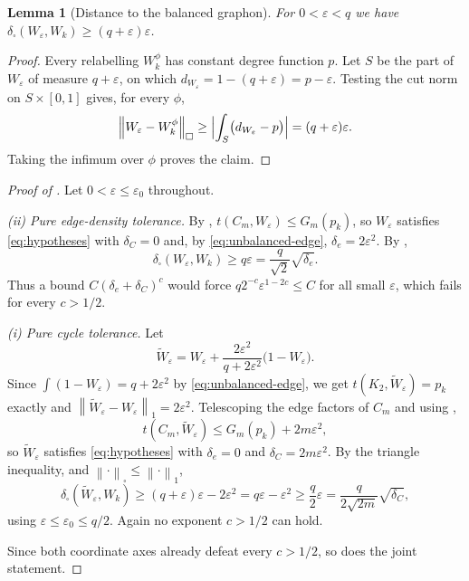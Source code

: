 \documentclass[11pt]{article}
\newtheorem{lemma}[theorem]{Lemma}
\theoremstyle{remark}
\newcommand{\dsq}{\delta_{\square}}
\newcommand{\norm}[1]{\left\lVert #1\right\rVert}
\begin{document}
\begin{lemma}[Distance to the balanced graphon]\label{lem:distance}
For $0<\varepsilon<q$ we have
$\dsq(W_\varepsilon,W_k)\geq(q+\varepsilon)\varepsilon$.
\end{lemma}

\begin{proof}
Every relabelling $W_k^\phi$ has constant degree function $p$. Let $S$ be
the part of $W_\varepsilon$ of measure $q+\varepsilon$, on which
$d_{W_\varepsilon}=1-(q+\varepsilon)=p-\varepsilon$. Testing the cut norm
on $S\times[0,1]$ gives, for every $\phi$,
\[
 \norm{W_\varepsilon-W_k^\phi}_{\square}
 \geq\Bigl\lvert\int_S\bigl(d_{W_\varepsilon}-p\bigr)\Bigr\rvert
 =(q+\varepsilon)\varepsilon .
\]
Taking the infimum over $\phi$ proves the claim.
\end{proof}

\begin{proof}[Proof of ]
Let $0<\varepsilon\leq\varepsilon_0$ throughout.

\emph{(ii) Pure edge-density tolerance.}
By , $t(C_m,W_\varepsilon)\leq G_m(p_k)$, so
$W_\varepsilon$ satisfies \eqref{eq:hypotheses} with
$\delta_C=0$ and, by \eqref{eq:unbalanced-edge},
$\delta_e=2\varepsilon^2$. By ,
\[
 \dsq(W_\varepsilon,W_k)\geq q\varepsilon
 =\frac{q}{\sqrt2}\sqrt{\delta_e}.
\]
Thus a bound $C(\delta_e+\delta_C)^c$ would force
$q2^{-c}\varepsilon^{1-2c}\leq C$ for all small $\varepsilon$, which
fails for every $c>1/2$.

\emph{(i) Pure cycle tolerance.}
Let
\[
 \widetilde W_\varepsilon
 =W_\varepsilon+\frac{2\varepsilon^2}{q+2\varepsilon^2}
 \bigl(1-W_\varepsilon\bigr).
\]
Since $\int(1-W_\varepsilon)=q+2\varepsilon^2$ by
\eqref{eq:unbalanced-edge}, we get
$t(K_2,\widetilde W_\varepsilon)=p_k$ exactly and
$\norm{\widetilde W_\varepsilon-W_\varepsilon}_1=2\varepsilon^2$.
Telescoping the edge factors of $C_m$ and using ,
\[
 t(C_m,\widetilde W_\varepsilon)\leq G_m(p_k)+2m\varepsilon^2,
\]
so $\widetilde W_\varepsilon$ satisfies \eqref{eq:hypotheses} with
$\delta_e=0$ and $\delta_C=2m\varepsilon^2$. By the triangle inequality,
 and $\norm\cdot_\square\leq\norm\cdot_1$,
\[
 \dsq(\widetilde W_\varepsilon,W_k)
 \geq(q+\varepsilon)\varepsilon-2\varepsilon^2
 =q\varepsilon-\varepsilon^2\geq\frac q2\varepsilon
 =\frac{q}{2\sqrt{2m}}\sqrt{\delta_C},
\]
using $\varepsilon\leq\varepsilon_0\leq q/2$. Again no exponent
$c>1/2$ can hold.

Since both coordinate axes already defeat every $c>1/2$, so does the
joint statement.
\end{proof}
\end{document}
